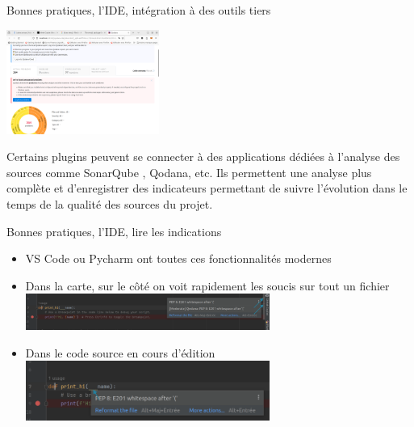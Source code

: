 \documentclass{beamer}
\begin{document}
    \begin{frame}{Bonnes pratiques, l'IDE, intégration à des outils tiers}

        \centering
        \includegraphics[width=5cm]{image/Qodana-result}

        \bigbreak

        \begin{flushleft}
            Certains plugins peuvent se connecter à des applications dédiées à l'analyse des sources comme SonarQube , Qodana, etc.
            Ils permettent une analyse plus complète et d'enregistrer des indicateurs permettant de suivre l'évolution dans le temps de la qualité des sources du projet.
        \end{flushleft}
    \end{frame}

    \begin{frame}{Bonnes pratiques, l'IDE, lire les indications}

        \begin{itemize}
            \item VS Code ou Pycharm ont toutes ces fonctionnalités modernes
            \item Dans la carte, sur le côté on voit rapidement les soucis sur tout un fichier
            \bigbreak
            \includegraphics[width=8cm]{image/Pycharm-minimap}
            \item Dans le code source en cours d'édition
            \bigbreak
            \includegraphics[width=8cm]{image/Pycharm-waring-in-code}
        \end{itemize}

    \end{frame}
\end{document}

